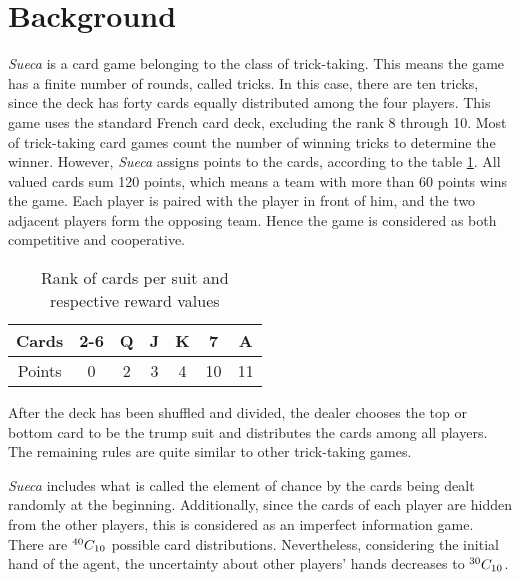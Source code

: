 \section{Background} \label{background}

\emph{Sueca} is a card game belonging to the class of trick-taking. This means the game has a finite number of rounds, called tricks. In this case, there are ten tricks, since the deck has forty cards equally distributed among the four players. This game uses the standard French card deck, excluding the rank 8 through 10. Most of trick-taking card games count the number of winning tricks to determine the winner. However, \emph{Sueca} assigns points to the cards, according to the table \ref{points-table}. All valued cards sum 120 points, which means a team with more than 60 points wins the game. Each player is paired with the player in front of him, and the two adjacent players form the opposing team. Hence the game is considered as both competitive and cooperative.

\begin{table}[h]
\centering
\begin{tabular}{|c|c|c|c|c|c|c|}
\hline
Cards  & 2-6 & Q & J & K & 7  & A  \\ \hline
Points & 0   & 2 & 3 & 4 & 10 & 11 \\ \hline
\end{tabular}
\caption{Rank of cards per suit and respective reward values}
\label{points-table}
\end{table}

After the deck has been shuffled and divided, the dealer chooses the top or bottom card to be the trump suit and distributes the cards among all players. The remaining rules are quite similar to other trick-taking games.

\emph{Sueca} includes what is called the element of chance by the cards being dealt randomly at the beginning. Additionally, since the cards of each player are hidden from the other players, this is considered as an imperfect information game. There are ${}^{40}C_{10}$ possible card distributions. Nevertheless, considering the initial hand of the agent, the uncertainty about other players' hands decreases to ${}^{30}C_{10}$.

